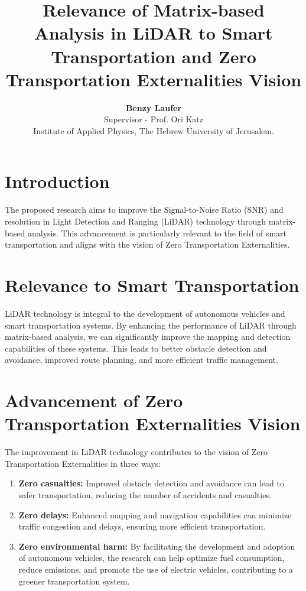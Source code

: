 \documentclass{article}
\title{\textbf{\Large Relevance of Matrix-based Analysis in LiDAR to Smart Transportation and Zero Transportation Externalities Vision}}
\author{\textbf{Benzy Laufer} \\ Supervisor - Prof. Ori Katz \\ Institute of Applied Physics, The Hebrew University of Jerusalem.}
\begin{document}
\maketitle

\section{Introduction}
The proposed research aims to improve the Signal-to-Noise Ratio (SNR) and resolution in Light Detection and Ranging (LiDAR) technology through matrix-based analysis. This advancement is particularly relevant to the field of smart transportation and aligns with the vision of Zero Transportation Externalities.

\section{Relevance to Smart Transportation}
LiDAR technology is integral to the development of autonomous vehicles and smart transportation systems. By enhancing the performance of LiDAR through matrix-based analysis, we can significantly improve the mapping and detection capabilities of these systems. This leads to better obstacle detection and avoidance, improved route planning, and more efficient traffic management. 

\section{Advancement of Zero Transportation Externalities Vision}
The improvement in LiDAR technology contributes to the vision of Zero Transportation Externalities in three ways:

\begin{enumerate}
    \item \textbf{Zero casualties:} Improved obstacle detection and avoidance can lead to safer transportation, reducing the number of accidents and casualties.
    \item \textbf{Zero delays:} Enhanced mapping and navigation capabilities can minimize traffic congestion and delays, ensuring more efficient transportation.
    \item \textbf{Zero environmental harm:} By facilitating the development and adoption of autonomous vehicles, the research can help optimize fuel consumption, reduce emissions, and promote the use of electric vehicles, contributing to a greener transportation system.
\end{enumerate}
\end{document}
